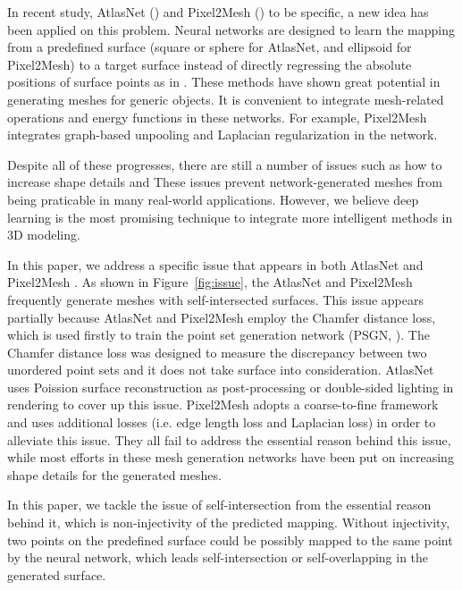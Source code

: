 In recent study, AtlasNet (\cite{atlasnet}) and Pixel2Mesh (\cite{pixel2mesh}) to be specific, a new idea has been applied on this problem. Neural networks are designed to learn the mapping from a predefined surface (square or sphere for AtlasNet, and ellipsoid for Pixel2Mesh) to a target surface instead of directly regressing the absolute positions of surface points as in \cite{PSGN}. These methods have shown great potential in generating meshes for generic objects. It is convenient to integrate mesh-related operations and energy functions in these networks. For example, Pixel2Mesh integrates graph-based unpooling and Laplacian regularization in the network.

Despite all of these progresses, there are still a number of issues such as how to increase shape details and  These issues prevent network-generated meshes from being praticable in many real-world applications. However, we believe deep learning is the most promising technique to integrate more intelligent methods in 3D modeling.

 In this paper, we address a specific issue that appears in both AtlasNet \cite{atlasnet} and Pixel2Mesh \cite{pixel2mesh}. As shown in Figure~\ref{fig:issue}, the AtlasNet and Pixel2Mesh frequently generate meshes with self-intersected surfaces. This issue appears partially because AtlasNet and Pixel2Mesh employ the Chamfer distance loss, which is used firstly to train the point set generation network (PSGN, \cite{PSGN}). The Chamfer distance loss was designed to measure the discrepancy between two unordered point sets and it does not take surface into consideration. AtlasNet uses Poission surface reconstruction as post-processing or double-sided lighting in rendering to cover up this issue. Pixel2Mesh adopts a coarse-to-fine framework and uses additional losses (i.e. edge length loss and Laplacian loss) in order to alleviate this issue. They all fail to address the essential reason behind this issue, while most efforts in these mesh generation networks have been put on increasing shape details for the generated meshes.

In this paper, we tackle the issue of self-intersection from the essential reason behind it, which is non-injectivity of the predicted mapping. Without injectivity, two points on the predefined surface could be possibly mapped to the same point by the neural network, which leads self-intersection or self-overlapping in the generated surface.

